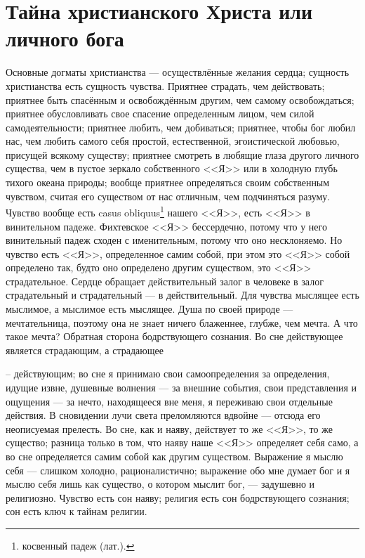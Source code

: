 \documentclass[12pt,oneside]{book}
\begin{document}
\chapter{Тайна христианского Христа или личного бога}


Основные догматы христианства --- осуществлённые желания сердца; сущность христианства есть сущность чувства. Приятнее страдать, чем действовать; приятнее быть спасённым и освобождённым другим, чем самому освобождаться; приятнее обусловливать свое спасение определенным лицом, чем силой самодеятельности; приятнее любить, чем добиваться; приятнее, чтобы бог любил нас, чем любить самого себя простой, естественной, эгоистической любовью, присущей всякому существу; приятнее смотреть в любящие глаза другого личного существа, чем в пустое зеркало собственного <<Я>> или в холодную глубь тихого океана природы; вообще приятнее определяться своим собственным чувством, считая его существом от нас отличным, чем подчиняться разуму. Чувство вообще есть casus obliquus\footnote{косвенный падеж (лат.).} нашего <<Я>>, есть <<Я>> в винительном падеже. Фихтевское <<Я>> бессердечно, потому что у него винительный падеж сходен с именительным, потому что оно несклоняемо. Но чувство есть <<Я>>, определенное самим собой, при этом это <<Я>> собой определено так, будто оно определено другим существом, это <<Я>> страдательное. Сердце обращает действительный залог в человеке в залог страдательный и страдательный --- в действительный. Для чувства мыслящее есть мыслимое, а мыслимое есть мыслящее. Душа по своей природе --- мечтательница, поэтому она не знает ничего блаженнее, глубже, чем мечта. А что такое мечта? Обратная сторона бодрствующего сознания. Во сне действующее является страдающим, а страдающее

– действующим; во сне я принимаю свои самоопределения за определения, идущие извне, душевные волнения --- за внешние события, свои представления и ощущения --- за нечто, находящееся вне меня, я переживаю свои отдельные действия. В сновидении лучи света преломляются вдвойне --- отсюда его неописуемая прелесть. Во сне, как и наяву, действует то же <<Я>>, то же существо; разница только в том, что наяву наше <<Я>> определяет себя само, а во сне определяется самим собой как другим существом. Выражение я мыслю себя --- слишком холодно, рационалистично; выражение обо мне думает бог и я мыслю себя лишь как существо, о котором мыслит бог, --- задушевно и религиозно. Чувство есть сон наяву; религия есть сон бодрствующего сознания; сон есть ключ к тайнам религии.
\end{document}
